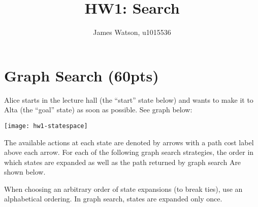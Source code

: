 \documentclass[fleqn]{hermans-hw}
\title{HW1: Search}
\institute{University of Utah}
\author{James Watson, u1015536}
\begin{document}
\maketitle
\section{Graph Search (60pts)}

Alice starts in the lecture hall (the ``start'' state below) and wants to make it to Alta (the ``goal'' state) as soon as possible. See graph below:

\texttt{[image: hw1-statespace]}

The available actions at each state are denoted by arrows with a path cost label above each arrow.  For each of the following graph search
strategies, the order in which states are expanded as well as the path returned by graph search Are shown below.  

When choosing an arbitrary order of state expansions (to break ties), use an alphabetical ordering.  In graph search, states are expanded only once.

\end{document}
